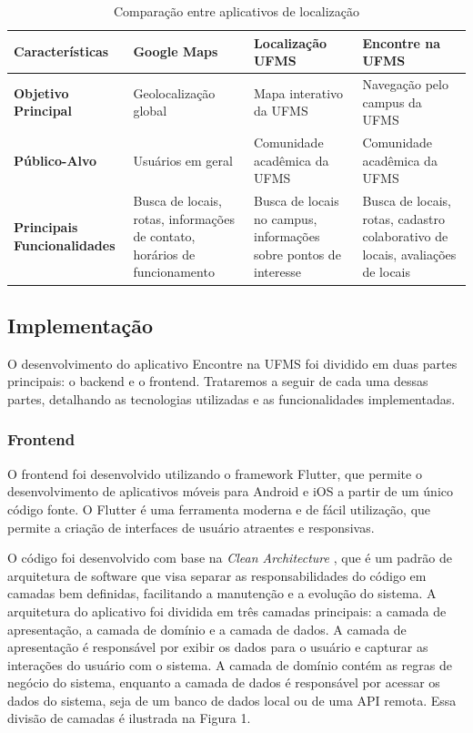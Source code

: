 \begin{table}[h]
    \begin{tabularx}{\textwidth}{|X|X|X|X|}
        \hline
        \textbf{Características} & \textbf{Google Maps} & \textbf{Localização UFMS} & \textbf{Encontre na UFMS} \\ \hline
        \textbf{Objetivo Principal} & Geolocalização global & Mapa interativo da UFMS & Navegação pelo campus da UFMS \\ \hline
        \textbf{Público-Alvo} & Usuários em geral & Comunidade acadêmica da UFMS & Comunidade acadêmica da UFMS \\ \hline
        \textbf{Principais Funcionalidades} & Busca de locais, rotas, informações de contato, horários de funcionamento & Busca de locais no campus, informações sobre pontos de interesse & Busca de locais, rotas, cadastro colaborativo de locais, avaliações de locais \\ \hline
    \end{tabularx}
    \caption{Comparação entre aplicativos de localização}
    \label{tab:comparacao-aplicativos}
\end{table}

\subsection{Implementação}

    O desenvolvimento do aplicativo Encontre na UFMS foi dividido em duas partes principais: o backend e o frontend. Trataremos a seguir de cada uma dessas partes, detalhando as tecnologias utilizadas e as funcionalidades implementadas.

\subsubsection{Frontend}

    O frontend foi desenvolvido utilizando o framework Flutter, que permite o desenvolvimento de aplicativos móveis para Android e iOS a partir de um único código fonte. O Flutter é uma ferramenta moderna e de fácil utilização, que permite a criação de interfaces de usuário atraentes e responsivas.

    O código foi desenvolvido com base na \textit{Clean Architecture} \cite{cleanarchitecture}, que é um padrão de arquitetura de software que visa separar as responsabilidades do código em camadas bem definidas, facilitando a manutenção e a evolução do sistema. A arquitetura do aplicativo foi dividida em três camadas principais: a camada de apresentação, a camada de domínio e a camada de dados. A camada de apresentação é responsável por exibir os dados para o usuário e capturar as interações do usuário com o sistema. A camada de domínio contém as regras de negócio do sistema, enquanto a camada de dados é responsável por acessar os dados do sistema, seja de um banco de dados local ou de uma API remota. Essa divisão de camadas é ilustrada na Figura 1.

